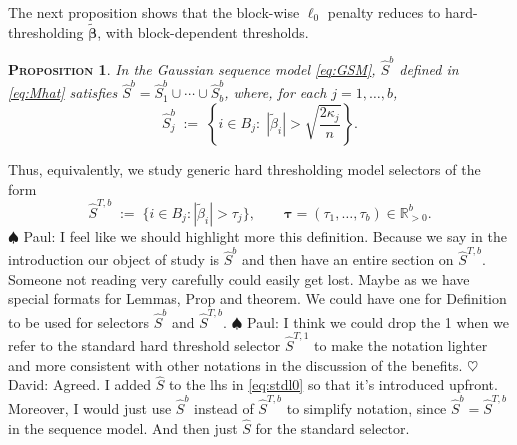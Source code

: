 \documentclass[aos]{imsart}
\theoremstyle{plain}
\newtheorem{prop}{\textsc{Proposition}}[section]
\newcommand{\david}[1]{{\small{\color{blue} \sf $\heartsuit$ David: #1}}}
\newcommand{\paul}[1]{{\small{\color{green} \sf $\spadesuit$ Paul: #1}}}
\newcommand{\R}{\mathbb{R}}
\newcommand{\bs}{\boldsymbol}
\begin{document}

The next proposition shows that the block-wise $\ell_0$ penalty reduces to hard-thresholding $\tilde{\bs \beta}$, with block-dependent thresholds.
\begin{prop}\label{prop:isthresh}
	In the Gaussian sequence model \eqref{eq:GSM}, $\hat{S}^b$ defined in \eqref{eq:Mhat} satisfies $\hat S^b=\hat S^b_1\cup \cdots \cup \hat S^b_b$, where, for each $j=1,\ldots,b$,
	$$
	\hat S_j^b\;:=\;\left\{i\in B_j:\; |\tilde{\beta}_i|> \sqrt{\frac{2\kappa_j}{n}}\right\}.
	$$ 
\end{prop}

Thus, equivalently, we study generic hard thresholding model selectors of the form
\begin{equation}\label{eq:thresholdS}
\hat S^{T,b}\;:=\;\{i\in B_j: |\tilde{\beta}_i|>\tau_j\}, \qquad\bs \tau=(\tau_1,\ldots,\tau_b)\in \R^b_{>0}.	
\end{equation}
\paul{I feel like we should highlight more this definition. Because we say in the introduction our object of study is $\hat S^b$ and then have an entire section on $\hat S^{T,b}$. Someone not reading very carefully could easily get lost. Maybe as we have special formats for Lemmas, Prop and theorem. We could have one for Definition to be used for selectors $\hat S^b$ and $\hat S^{T,b}$.}
\paul{I think we could drop the 1 when we refer to the standard hard threshold selector $\hat S^{T,1}$ to make the notation lighter and more consistent with other notations in the discussion of the benefits.}
\david{Agreed. I added $\hat{S}$ to the lhs in \eqref{eq:stdl0} so that it's introduced upfront. Moreover, I would just use $\hat{S}^b$ instead of $\hat{S}^{T,b}$ to simplify notation, since $\hat{S}^{b}=\hat{S}^{T,b}$ in the sequence model. And then just $\hat{S}$ for the standard selector.}
\end{document}
